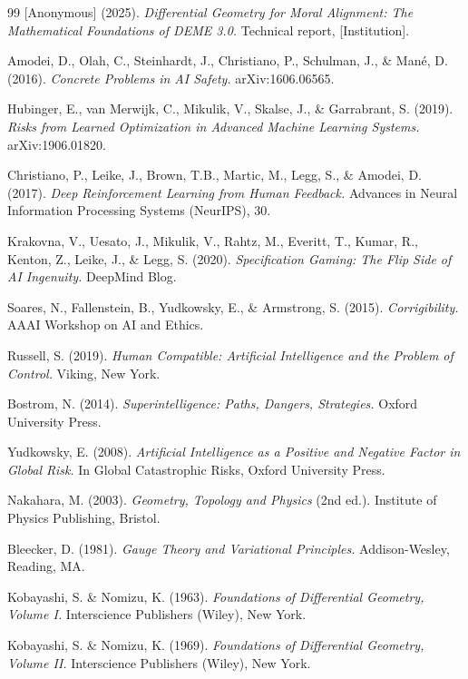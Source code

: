\documentclass[11pt,letterpaper]{article}
\theoremstyle{definition}
\theoremstyle{remark}
\begin{document}
\begin{thebibliography}{99}
[Anonymous] (2025). \emph{Differential Geometry for Moral Alignment: The Mathematical Foundations of DEME 3.0.} Technical report, [Institution].

Amodei, D., Olah, C., Steinhardt, J., Christiano, P., Schulman, J., \& Man\'e, D. (2016). \emph{Concrete Problems in AI Safety.} arXiv:1606.06565.

Hubinger, E., van Merwijk, C., Mikulik, V., Skalse, J., \& Garrabrant, S. (2019). \emph{Risks from Learned Optimization in Advanced Machine Learning Systems.} arXiv:1906.01820.

Christiano, P., Leike, J., Brown, T.B., Martic, M., Legg, S., \& Amodei, D. (2017). \emph{Deep Reinforcement Learning from Human Feedback.} Advances in Neural Information Processing Systems (NeurIPS), 30.

Krakovna, V., Uesato, J., Mikulik, V., Rahtz, M., Everitt, T., Kumar, R., Kenton, Z., Leike, J., \& Legg, S. (2020). \emph{Specification Gaming: The Flip Side of AI Ingenuity.} DeepMind Blog.

Soares, N., Fallenstein, B., Yudkowsky, E., \& Armstrong, S. (2015). \emph{Corrigibility.} AAAI Workshop on AI and Ethics.

Russell, S. (2019). \emph{Human Compatible: Artificial Intelligence and the Problem of Control.} Viking, New York.

Bostrom, N. (2014). \emph{Superintelligence: Paths, Dangers, Strategies.} Oxford University Press.

Yudkowsky, E. (2008). \emph{Artificial Intelligence as a Positive and Negative Factor in Global Risk.} In Global Catastrophic Risks, Oxford University Press.

Nakahara, M. (2003). \emph{Geometry, Topology and Physics} (2nd ed.). Institute of Physics Publishing, Bristol.

Bleecker, D. (1981). \emph{Gauge Theory and Variational Principles.} Addison-Wesley, Reading, MA.

Kobayashi, S. \& Nomizu, K. (1963). \emph{Foundations of Differential Geometry, Volume I.} Interscience Publishers (Wiley), New York.

Kobayashi, S. \& Nomizu, K. (1969). \emph{Foundations of Differential Geometry, Volume II.} Interscience Publishers (Wiley), New York.


\end{thebibliography}
\end{document}
